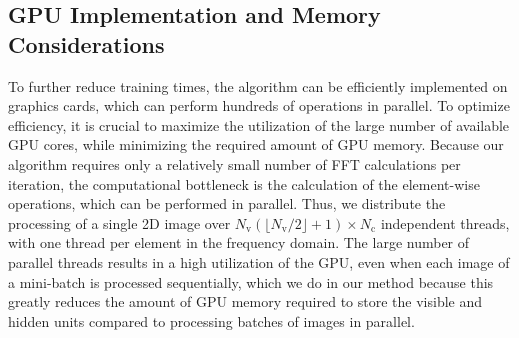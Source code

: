 \subsection[GPU implementation and memory considerations]{GPU Implementation and
Memory Considerations}

To further reduce training times, the algorithm can be efficiently implemented
on graphics cards, which can perform hundreds of operations in parallel.
To optimize efficiency, it is crucial to maximize the utilization of the large
number of available GPU cores, while minimizing the required amount of GPU
memory. Because our algorithm requires only a relatively small number of FFT
calculations per iteration, the computational bottleneck is the calculation of
the element-wise operations, which can be performed in parallel. Thus, we
distribute the processing of a single 2D image over $N_\text{v}(\lfloor
N_\text{v}/2 \rfloor + 1) \times N_\text{c}$ independent threads, with one
thread per element in the frequency domain. The large number of parallel threads
results in a high utilization of the GPU, even when each image of a mini-batch
is processed sequentially, which we do in our method because this greatly
reduces the amount of GPU memory required to store the visible and hidden units
compared to processing batches of images in parallel.

